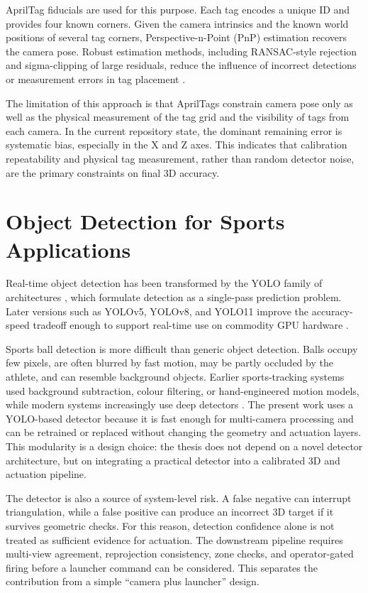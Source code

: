 AprilTag fiducials \cite{ref11} are used for this purpose. Each tag encodes a unique ID and provides four known corners. Given the camera intrinsics and the known world positions of several tag corners, Perspective-n-Point (PnP) estimation recovers the camera pose. Robust estimation methods, including RANSAC-style rejection and sigma-clipping of large residuals, reduce the influence of incorrect detections or measurement errors in tag placement \cite{ref12}.

The limitation of this approach is that AprilTags constrain camera pose only as well as the physical measurement of the tag grid and the visibility of tags from each camera. In the current repository state, the dominant remaining error is systematic bias, especially in the X and Z axes. This indicates that calibration repeatability and physical tag measurement, rather than random detector noise, are the primary constraints on final 3D accuracy.

\section{Object Detection for Sports Applications}

Real-time object detection has been transformed by the YOLO family of architectures \cite{ref13}, which formulate detection as a single-pass prediction problem. Later versions such as YOLOv5, YOLOv8, and YOLO11 improve the accuracy-speed tradeoff enough to support real-time use on commodity GPU hardware \cite{ref14}.

Sports ball detection is more difficult than generic object detection. Balls occupy few pixels, are often blurred by fast motion, may be partly occluded by the athlete, and can resemble background objects. Earlier sports-tracking systems used background subtraction, colour filtering, or hand-engineered motion models, while modern systems increasingly use deep detectors \cite{ref5, ref6}. The present work uses a YOLO-based detector because it is fast enough for multi-camera processing and can be retrained or replaced without changing the geometry and actuation layers. This modularity is a design choice: the thesis does not depend on a novel detector architecture, but on integrating a practical detector into a calibrated 3D and actuation pipeline.

The detector is also a source of system-level risk. A false negative can interrupt triangulation, while a false positive can produce an incorrect 3D target if it survives geometric checks. For this reason, detection confidence alone is not treated as sufficient evidence for actuation. The downstream pipeline requires multi-view agreement, reprojection consistency, zone checks, and operator-gated firing before a launcher command can be considered. This separates the contribution from a simple ``camera plus launcher'' design.

